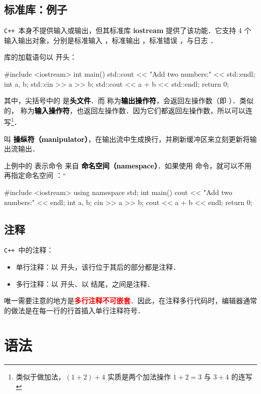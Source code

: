 \documentclass[a4paper, zihao=-4, linespread=1]{ctexrep}
\newcommand\cpp{\texttt{C++}}
\newcommand\cpplib[1]{\textcolor{red!80!black}{\bfseries #1}}
\newcommand\hlt[1]{\textcolor{red}{\bfseries #1}}
\newcommand\cppkw[1]{\textcolor{black}{\bfseries #1}}
\begin{document}
\section{标准库：例子}
\cpp\ 本身不提供输入或输出，但其标准库 \cpplib{iostream} 提供了该功能．它支持 4 个输入输出对象，分别是标准输入  ，标准输出 ，标准错误 ，与日志 ．

库的加载语句以  开头：
\begin{cpplang}
#include <iostream>
int main() {
    std::cout << "Add two numbers:" << std::endl;
    int a, b;
    std::cin >> a >> b;
    std::cout << a + b << std::endl;
    return 0;
}
\end{cpplang}
其中，尖括号中的  是\cppkw{头文件}．而 \cppline{<<} 称为\cppkw{输出操作符}，会返回左操作数（即 ）．类似的，\cppline{>>} 称为\cppkw{输入操作符}，也返回左操作数．因为它们都返回左操作数，所以可以连写\footnote{类似于做加法，$(1+2)+4$ 实质是两个加法操作 $1+2=3$ 与 $3+4$ 的连写}．

 叫 \cppkw{操纵符（manipulator）}，在输出流中生成换行，并刷新缓冲区来立刻更新将输出流输出．

上例中的  表示命令  来自  \cppkw{命名空间（namespace）}．如果使用  命令，就可以不用再指定命名空间 ：“
\begin{cpplang}
#include <iostream>
using namespace std;
int main() {
    cout << "Add two numbers:" << endl;
    int a, b;
    cin >> a >> b;
    cout << a + b << endl;
    return 0;
}
\end{cpplang} 

\section{注释}
\cpp\ 中的注释：
\begin{itemize}
\item 单行注释：以 \cppline{//} 开头，该行位于其后的部分都是注释．
\item 多行注释：以 \cppline{/*} 开头、以 \cppline{*/} 结尾，之间是注释．
\end{itemize}

唯一需要注意的地方是\hlt{多行注释不可嵌套}．因此，在注释多行代码时，编辑器通常的做法是在每一行的行首插入单行注释符号．

\chapter{语法}
\end{document}
